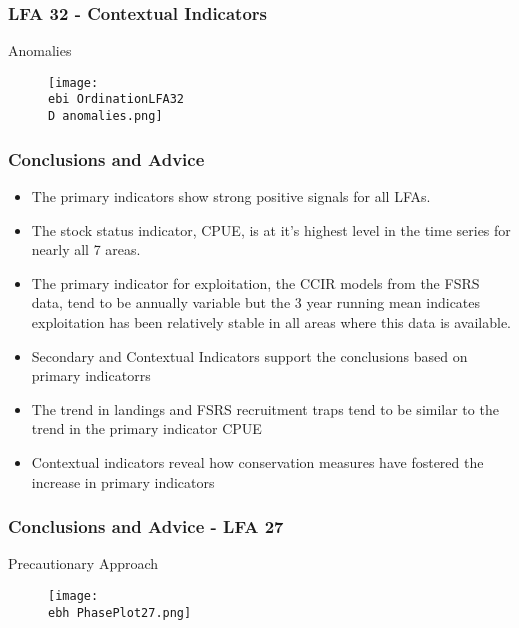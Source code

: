 \documentclass{beamer}
\newcommand{\ebh}{\string~/bio.data/bio.lobster/figures/Assessment/LFA2732/} %
\newcommand{\ebi}{\string~/bio.data/bio.lobster/figures/Assessment/Indicators/} %
\newcommand{\D}{.}
\begin{document}
\begin{frame}
\frametitle{LFA 32 - Contextual Indicators}
Anomalies
\begin{figure}
        \begin{center}
            \texttt{[image: \\ebi OrdinationLFA32\\D anomalies.png]}
        \end{center}
    \end{figure}
\end{frame}




\begin{frame}
\frametitle{Conclusions and Advice}
\begin{itemize}

\item The primary indicators show strong positive signals for all LFAs. 
\item The stock status indicator, CPUE, is at it’s highest level in the time series for nearly all 7 areas. 
\item The primary indicator for exploitation, the CCIR models from the FSRS data, tend to be annually variable but the 3 year running mean indicates exploitation has been relatively stable in all areas where this data is available. 
\item Secondary and Contextual Indicators support the conclusions based on primary indicatorrs
\item The trend in landings and FSRS recruitment traps tend to be similar to the trend in the primary indicator CPUE
\item Contextual indicators reveal how conservation measures have fostered the increase in primary indicators
\end{itemize}
\end{frame}



\begin{frame}
\frametitle{Conclusions and Advice - LFA 27}
Precautionary Approach
\begin{figure}
        \begin{center}
            \texttt{[image: \\ebh PhasePlot27.png]}
        \end{center}
    \end{figure}
\end{frame}
\end{document}
